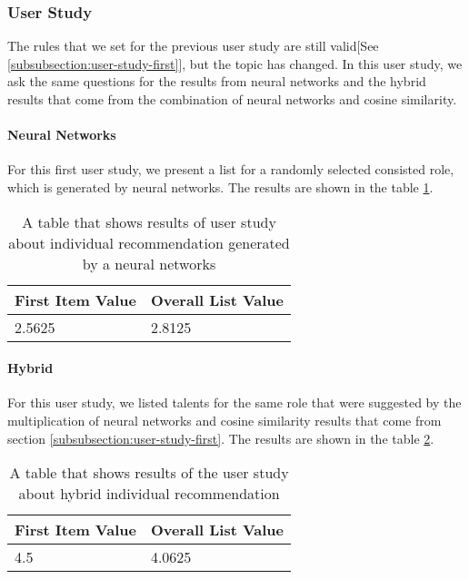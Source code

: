 \subsubsection{User Study}

The rules that we set for the previous user study are still valid[See \ref{subsubsection:user-study-first}], but the topic has changed. In this user study, we ask the same questions for the results from neural networks and the hybrid results that come from the combination of neural networks and cosine similarity.

\paragraph{Neural Networks}

For this first user study, we present a list for a randomly selected consisted role, which is generated by neural networks. The results are shown in the table \ref{tab:user-study-individual-rec-nn}.

\begin{table}[ht]
	\caption[User study individual neural networks]{A table that shows results of user study about individual recommendation generated by a neural networks}\label{tab:user-study-individual-rec-nn}
	\centering
	\begin{tabular}{l l}
		\toprule
		First Item Value & Overall List Value \\
		\midrule
		2.5625 & 2.8125 \\
		\bottomrule
	\end{tabular}
\end{table}

\paragraph{Hybrid}

For this user study, we listed talents for the same role that were suggested by the multiplication of neural networks and cosine similarity results that come from section \ref{subsubsection:user-study-first}. The results are shown in the table \ref{tab:user-study-individual-rec-hybrid}.

\begin{table}[ht]
	\caption[User study individual hybrid]{A table that shows results of the user study about hybrid individual recommendation}\label{tab:user-study-individual-rec-hybrid}
	\centering
	\begin{tabular}{l l}
		\toprule
		First Item Value & Overall List Value \\
		\midrule
		4.5 & 4.0625 \\
		\bottomrule
	\end{tabular}
\end{table}

